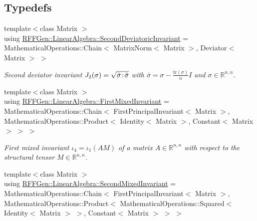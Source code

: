 \subsection*{Typedefs}
\begin{DoxyCompactItemize}
\item 
\hypertarget{group__InvariantGroup_gaa4038c9be971e12660b297d4fc02e245}{{\footnotesize template$<$class Matrix $>$ }\\using \hyperlink{group__InvariantGroup_gaa4038c9be971e12660b297d4fc02e245}{R\-F\-F\-Gen\-::\-Linear\-Algebra\-::\-Second\-Deviatoric\-Invariant} = Mathematical\-Operations\-::\-Chain$<$ Matrix\-Norm$<$ Matrix $>$, Deviator$<$ Matrix $>$ $>$}\label{group__InvariantGroup_gaa4038c9be971e12660b297d4fc02e245}

\begin{DoxyCompactList}\small\item\em Second deviator invariant $ J_2(\sigma)=\sqrt{\bar\sigma\negthinspace:\negthinspace\bar\sigma} $ with $\bar\sigma = \sigma - \frac{\mathrm{tr}(\sigma)}{n}I$ and $\sigma\in\mathbb{R}^{n,n}$. \end{DoxyCompactList}\item 
\hypertarget{group__InvariantGroup_ga9896f1432dd23593f147c31c0be9ccde}{{\footnotesize template$<$class Matrix $>$ }\\using \hyperlink{group__InvariantGroup_ga9896f1432dd23593f147c31c0be9ccde}{R\-F\-F\-Gen\-::\-Linear\-Algebra\-::\-First\-Mixed\-Invariant} = Mathematical\-Operations\-::\-Chain$<$ First\-Principal\-Invariant$<$ Matrix $>$, Mathematical\-Operations\-::\-Product$<$ Identity$<$ Matrix $>$, Constant$<$ Matrix $>$ $>$ $>$}\label{group__InvariantGroup_ga9896f1432dd23593f147c31c0be9ccde}

\begin{DoxyCompactList}\small\item\em First mixed invariant $ \iota_4=\iota_1(AM) $ of a matrix $A\in\mathbb{R}^{n,n}$ with respect to the structural tensor $M\in\mathbb{R}^{n,n}$. \end{DoxyCompactList}\item 
\hypertarget{group__InvariantGroup_ga95c502f232d267e4f199747024152206}{{\footnotesize template$<$class Matrix $>$ }\\using \hyperlink{group__InvariantGroup_ga95c502f232d267e4f199747024152206}{R\-F\-F\-Gen\-::\-Linear\-Algebra\-::\-Second\-Mixed\-Invariant} = Mathematical\-Operations\-::\-Chain$<$ First\-Principal\-Invariant$<$ Matrix $>$, Mathematical\-Operations\-::\-Product$<$ Mathematical\-Operations\-::\-Squared$<$ Identity$<$ Matrix $>$ $>$, Constant$<$ Matrix $>$ $>$ $>$}\label{group__InvariantGroup_ga95c502f232d267e4f199747024152206}


\end{DoxyCompactItemize}
